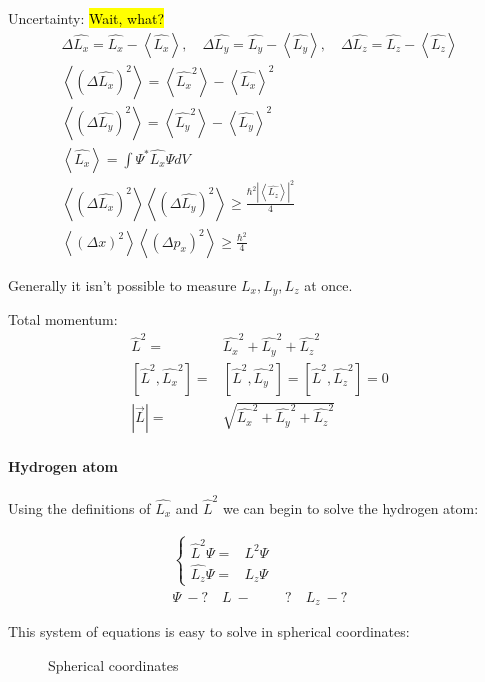 	Uncertainty: \hl{Wait, what?}
	\begin{align}
		\Delta \hat{L_x} = \hat{L_x} - \left<\hat{L_x} \right>, \quad
		\Delta \hat{L_y} = \hat{L_y} - \left<\hat{L_y} \right>, \quad
		\Delta \hat{L_z} = \hat{L_z} - \left<\hat{L_z} \right> \\
		\left<(\Delta\hat{L_x})^2 \right> = \left<\hat{L_x}^2 \right> - \left<\hat{L_x} \right>^2 \\
		\left<(\Delta\hat{L_y})^2 \right> = \left<\hat{L_y}^2 \right> - \left<\hat{L_y} \right>^2 \\
		\left<\hat{L_x} \right> = \int \Psi^* \hat{L_x} \Psi dV \\ 
		\left<(\Delta\hat{L_x})^2 \right>\left<(\Delta\hat{L_y})^2 \right> \geq \frac{\hbar^2|\left<\hat{L_z}\right>|^2}{4} \\
		\left<(\Delta x)^2 \right>\left<(\Delta p_x)^2 \right> \geq \frac{\hbar^2}{4} \nonumber				
	\end{align}
	
	Generally it isn't possible to measure $L_x, L_y, L_z$ at once. 
	
	Total momentum:
	\begin{align}
		\hat{L}^2 =& \hat{L_x}^2 + \hat{L_y}^2 + \hat{L_z}^2 \\
		\left[\hat{L}^2, \hat{L_x}^2\right] =& \left[\hat{L}^2, \hat{L_y}^2\right] = \left[\hat{L}^2, \hat{L_z}^2\right] = 0 \\
		|\vec{L}| =& \sqrt{\hat{L_x}^2 + \hat{L_y}^2 + \hat{L_z}^2}								
	\end{align}
	
	\paragraph{Hydrogen atom}		
	Using the definitions of $\hat{L_x}$ and $\hat{L}^2$ we can begin to solve the hydrogen atom:
	
	\begin{align}
		\left\{ \begin{aligned}
			\hat{L}^2 \Psi =& L^2 \Psi \\
			\hat{L_z} \Psi =& L_z \Psi  
		\end{aligned} \right. \\
		\Psi~-? \quad L~-&? \quad L_z~-? \nonumber
		\label{hydrogensystem1}
	\end{align}
	
	This system of equations is easy to solve in spherical coordinates:
	\begin{figure}[!h]
		\centering
		
		\caption{Spherical coordinates}
	\end{figure}
	

